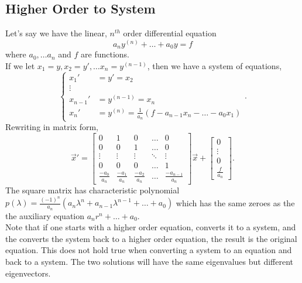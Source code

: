 \subsection{Higher Order to System}
\noindent
Let's say we have the linear, $n^{th}$ order differential equation
\begin{equation*}
	a_ny^{(n)} + \ldots + a_0y = f
\end{equation*}
where $a_0, \ldots a_n$ and $f$ are functions.\\

\noindent
If we let $x_1 = y, x_2 = y', \ldots x_n = y^{(n-1)}$, then we have a system of equations,
\begin{equation*}
	\begin{cases}
		x_1' &= y' = x_2 \\
		\vdots \\
		x_{n-1}' &= y^{(n-1)} = x_n \\
		x_n' &= y^{(n)} = \frac{1}{a_n}\left(f - a_{n-1}x_n - \ldots - a_0x_1\right)
	\end{cases}.
\end{equation*}
Rewriting in matrix form,
\begin{equation*}
	\vec{x}' = \begin{bmatrix}
		0 & 1 & 0 & \ldots & 0 \\
		0 & 0 & 1 & \ldots & 0 \\
		\vdots & \vdots	& \vdots & \ddots & \vdots \\
		0 & 0 & 0 & \ldots & 1 \\
		\frac{-a_0}{a_n} & \frac{-a_1}{a_n} & \frac{-a_2}{a_n} & \ldots & \frac{-a_{n-1}}{a_n} 
	\end{bmatrix} \vec{x} + \begin{bmatrix}
		0 \\
		\vdots \\
		0 \\
		\frac{f}{a_n}
	\end{bmatrix}.
\end{equation*}
The square matrix has characteristic polynomial $p(\lambda) = \frac{(-1)^{n}}{a_n}\left(a_n\lambda^n + a_{n-1}\lambda^{n-1} + \ldots + a_0\right)$ which has the same zeroes as the the auxiliary equation $a_nr^n + \ldots + a_0$.\\

\noindent
Note that if one starts with a higher order equation, converts it to a system, and the converts the system back to a higher order equation, the result is the original equation.
This does not hold true when converting a system to an equation and back to a system.
The two solutions will have the same eigenvalues but different eigenvectors.
